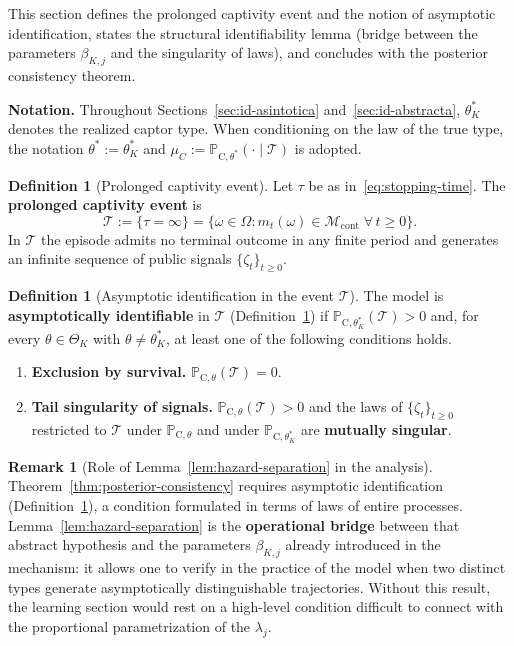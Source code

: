 \documentclass[ecta,nameyear,final,supplement]{econsocart}
\numberwithin{equation}{section}
\numberwithin{table}{section}
\theoremstyle{definition}
\newtheorem{definition}[theorem]{Definition}
\newtheorem{remark}[theorem]{Remark}
\newcommand{\ProbC}[1]{\mathbb{P}_{\mathrm{C},#1}}
\begin{document}
\noindent This section defines the prolonged captivity event and the notion of
asymptotic identification, states the structural identifiability lemma (bridge
between the parameters $\beta_{K,j}$ and the singularity of laws), and
concludes with the posterior consistency theorem.

\medskip
\noindent\textbf{Notation.}
Throughout Sections~\ref{sec:id-asintotica} and~\ref{sec:id-abstracta},
$\theta_K^\ast$ denotes the realized captor type. When conditioning on the law
of the true type, the notation $\theta^\ast:=\theta_K^\ast$ and
$\mu_C:=\ProbC{\theta^\ast}(\cdot\mid\mathcal{T})$ is adopted.


\begin{definition}[Prolonged captivity event]
\label{def:event-T-long}
Let $\tau$ be as in~\eqref{eq:stopping-time}. The
\textbf{prolonged captivity event} is
\[
\mathcal{T}
:=\{\tau=\infty\}
=\bigl\{\omega\in\Omega:m_t(\omega)\in\mathcal{M}_{\mathrm{cont}}\;\forall\,t\ge 0\bigr\}.
\]
In $\mathcal{T}$ the episode admits no terminal outcome in any finite period
and generates an infinite sequence of public signals
$\{\zeta_t\}_{t\ge 0}$.
\end{definition}

\bigskip

\begin{definition}[Asymptotic identification in the event $\mathcal{T}$]
\label{def:asymptotic-id}
The model is \textbf{asymptotically identifiable} in $\mathcal{T}$
(Definition~\ref{def:event-T-long}) if
$\ProbC{\theta_K^\ast}(\mathcal{T})>0$ and, for every $\theta\in\Theta_K$ with
$\theta\neq\theta_K^\ast$, at least one of the following conditions holds.
\begin{enumerate}
  \item[\textup{(a)}] \textbf{Exclusion by survival.}
  $\ProbC{\theta}(\mathcal{T})=0$.
  \item[\textup{(b)}] \textbf{Tail singularity of signals.}
  $\ProbC{\theta}(\mathcal{T})>0$ and the laws of $\{\zeta_t\}_{t\ge 0}$
  restricted to $\mathcal{T}$ under $\ProbC{\theta}$ and under
  $\ProbC{\theta_K^\ast}$ are \textbf{mutually singular}.
\end{enumerate}
\end{definition}

\begin{remark}[Role of Lemma~\ref{lem:hazard-separation} in the analysis]
Theorem~\ref{thm:posterior-consistency} requires asymptotic identification
(Definition~\ref{def:asymptotic-id}), a condition formulated in terms of
laws of entire processes. Lemma~\ref{lem:hazard-separation} is the
\textbf{operational bridge} between that abstract hypothesis and the
parameters $\beta_{K,j}$ already introduced in the mechanism: it allows one
to verify in the practice of the model when two distinct types generate
asymptotically distinguishable trajectories. Without this result, the learning
section would rest on a high-level condition difficult to connect with the
proportional parametrization of the $\lambda_j$.
\end{remark}
\end{document}
